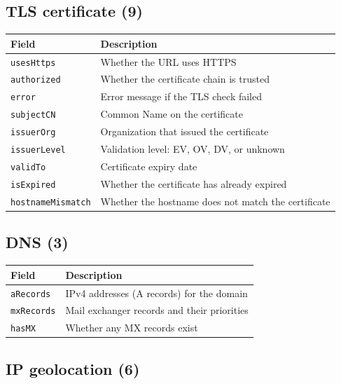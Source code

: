 \documentclass[11pt,a4paper]{article}
\begin{document}
\subsection{TLS certificate (9)}

\begin{tabular}{@{}p{3.8cm}p{9.4cm}@{}}
  \toprule
  \textbf{Field} & \textbf{Description} \\
  \midrule
  \texttt{usesHttps} & Whether the URL uses HTTPS \\
  \texttt{authorized} & Whether the certificate chain is trusted \\
  \texttt{error} & Error message if the TLS check failed \\
  \texttt{subjectCN} & Common Name on the certificate \\
  \texttt{issuerOrg} & Organization that issued the certificate \\
  \texttt{issuerLevel} & Validation level: EV, OV, DV, or unknown \\
  \texttt{validTo} & Certificate expiry date \\
  \texttt{isExpired} & Whether the certificate has already expired \\
  \texttt{hostnameMismatch} & Whether the hostname does not match the certificate \\
  \bottomrule
\end{tabular}

\subsection{DNS (3)}

\begin{tabular}{@{}p{3.2cm}p{10cm}@{}}
  \toprule
  \textbf{Field} & \textbf{Description} \\
  \midrule
  \texttt{aRecords} & IPv4 addresses (A records) for the domain \\
  \texttt{mxRecords} & Mail exchanger records and their priorities \\
  \texttt{hasMX} & Whether any MX records exist \\
  \bottomrule
\end{tabular}

\subsection{IP geolocation (6)}
\end{document}
